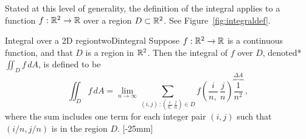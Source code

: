 \documentclass[svgnames]{watsonbook}
\begin{document}
  Stated at this level of generality, the definition of the integral
  applies to a function $f: \mathbb{R}^2 \to \mathbb{R}$ over a region $D
  \subset \mathbb{R}^2$. See Figure~\ref{fig:integraldef}. 
  \begin{defn}{Integral over a 2D region}{twoDintegral}
    Suppose $f: \mathbb{R}^2 \to \mathbb{R}$ is a continuous function, and that $D$ is a region in
    $\mathbb{R}^2$. Then the integral of $f$ over $D$, denoted*
    $\iint_D f \, dA$, is defined to be
    \begin{equation} \label{eq:def2D}
      \iint_D f \, dA = \lim_{n\to\infty} \sum_{(i,j) \, : \left(\frac{i}{n,} \,\frac{j}{n}\right) \in D}
      f\left(\frac{i}{n,}\,\frac{j}{n}\right)
      \overbrace{\frac{1}{n^2}}^{\Delta A} \:,  
    \end{equation}
    where the sum includes one term for each integer pair $(i,j)$ such
    that $(i/n,j/n)$ is in the region $D$.   [-25mm]
  \end{defn}
\end{document}

